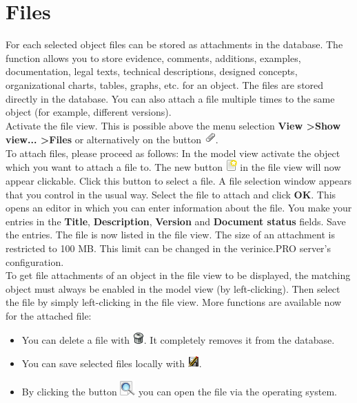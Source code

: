 \documentclass[a4paper,10pt]{book}
\begin{document}
\section{Files} \label{Files}
For each selected object files can be stored as attachments in the database. The function allows you to store evidence, comments, additions, examples,
documentation, legal texts, technical descriptions, designed concepts, organizational charts, tables, graphs, etc. for an object. The files are stored directly
in the database. You can also attach a file multiple times to the same object (for example, different versions).
\newline\\
Activate the file view. This is possible above the menu selection \textbf{View \textgreater Show view... \textgreater Files} or alternatively
on the button \includegraphics[height = 2ex]{Icon/Hinzufuegen.png}.
\newline\\
To attach files, please proceed as follows: In the model view activate the object which you want to attach a file to.
The new button \includegraphics[height=2ex]{Icon/Oeffnen.png} in the file view will now appear clickable. Click this button to select a file. A file selection
window appears that you control in the usual way. Select the file to attach and click \textbf{OK}. This opens an editor in which you can enter information
about the file. You make your entries in the \textbf{Title}, \textbf{Description}, \textbf{Version} and \textbf{Document status} fields. Save the entries. The file is now listed in the file view. The size of an attachment is restricted to 100 MB. This limit can be changed in the verinice.PRO server's configuration.
\newline\\
To get file attachments of an object in the file view to be displayed, the matching object must always be enabled in the model view (by left-clicking).
Then select the file by simply left-clicking in the file view. More functions are available now for the attached file:
\begin{itemize}
 \item You can delete a file with \includegraphics[height=2ex]{Icon/Delete.png}. It completely removes it from the database.
 \item You can save selected files locally with \includegraphics[height=2ex]{Icon/Save.png}.
 \item By clicking the button \includegraphics[height=2ex]{Icon/Suchen.png} you can open the file via the operating system.
\end{itemize}
\end{document}
